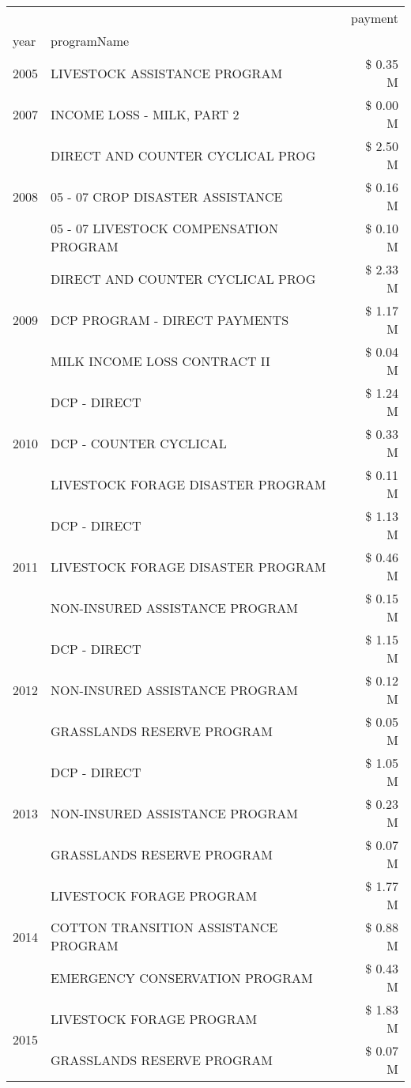 \begin{tabular}{llr}
\toprule
 &  & payment \\
year & programName &  \\
\midrule
2005 & LIVESTOCK ASSISTANCE PROGRAM & \$ 0.35 M \\
\cline{1-3}
2007 & INCOME LOSS - MILK, PART 2 & \$ 0.00 M \\
\cline{1-3}
\multirow[t]{3}{*}{2008} & DIRECT AND COUNTER CYCLICAL PROG & \$ 2.50 M \\
 & 05 - 07 CROP DISASTER ASSISTANCE & \$ 0.16 M \\
 & 05 - 07 LIVESTOCK COMPENSATION PROGRAM & \$ 0.10 M \\
\cline{1-3}
\multirow[t]{3}{*}{2009} & DIRECT AND COUNTER CYCLICAL PROG & \$ 2.33 M \\
 & DCP PROGRAM - DIRECT PAYMENTS & \$ 1.17 M \\
 & MILK INCOME LOSS CONTRACT II & \$ 0.04 M \\
\cline{1-3}
\multirow[t]{3}{*}{2010} & DCP - DIRECT & \$ 1.24 M \\
 & DCP - COUNTER CYCLICAL & \$ 0.33 M \\
 & LIVESTOCK FORAGE DISASTER PROGRAM & \$ 0.11 M \\
\cline{1-3}
\multirow[t]{3}{*}{2011} & DCP - DIRECT & \$ 1.13 M \\
 & LIVESTOCK FORAGE DISASTER PROGRAM & \$ 0.46 M \\
 & NON-INSURED ASSISTANCE PROGRAM & \$ 0.15 M \\
\cline{1-3}
\multirow[t]{3}{*}{2012} & DCP - DIRECT & \$ 1.15 M \\
 & NON-INSURED ASSISTANCE PROGRAM & \$ 0.12 M \\
 & GRASSLANDS RESERVE PROGRAM & \$ 0.05 M \\
\cline{1-3}
\multirow[t]{3}{*}{2013} & DCP - DIRECT & \$ 1.05 M \\
 & NON-INSURED ASSISTANCE PROGRAM & \$ 0.23 M \\
 & GRASSLANDS RESERVE PROGRAM & \$ 0.07 M \\
\cline{1-3}
\multirow[t]{3}{*}{2014} & LIVESTOCK FORAGE PROGRAM & \$ 1.77 M \\
 & COTTON TRANSITION ASSISTANCE PROGRAM & \$ 0.88 M \\
 & EMERGENCY CONSERVATION PROGRAM & \$ 0.43 M \\
\cline{1-3}
\multirow[t]{3}{*}{2015} & LIVESTOCK FORAGE PROGRAM & \$ 1.83 M \\
 & GRASSLANDS RESERVE PROGRAM & \$ 0.07 M \\

\end{tabular}
